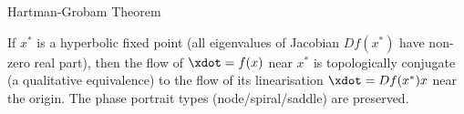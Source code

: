 \documentclass[aspectratio=169,xcolor=dvipsnames,svgnames,x11names,fleqn]{beamer}
\begin{document}
\begin{frame}{Hartman-Grobam Theorem}
    
        \begin{tcolorbox}[
        enhanced,
        rounded corners,
        boxrule=0.5pt, 
        leftrule=2mm, 
        colframe=orange!80!yellow,
        colback=WarmWhite,
        notitle,
        left=1mm 
    ]

    If $x^*$ is a hyperbolic fixed point (all eigenvalues of Jacobian $Df(x^*)$ have non-zero real part), then the flow of $\xdot = f(x)$ near $x^*$ is topologically conjugate (a qualitative equivalence) to the flow of its linearisation $\xdot = Df(x^*)x$ near the origin. The phase portrait types (node/spiral/saddle) are preserved.
    \end{tcolorbox}
\end{frame}
\end{document}
